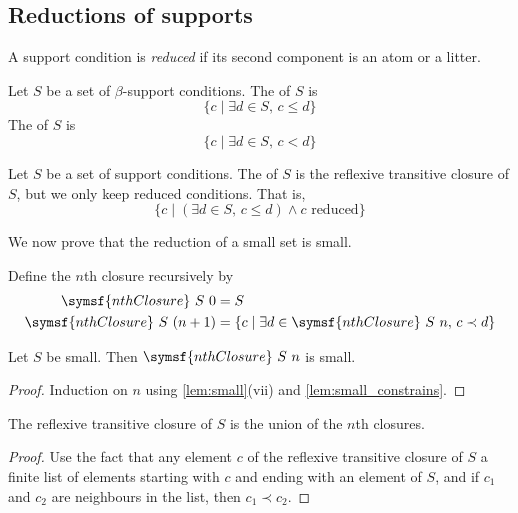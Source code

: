 \subsection{Reductions of supports}
\begin{definition}
    A support condition is \emph{reduced} if its second component is an atom or a litter.
\end{definition}
\begin{definition}
    Let \( S \) be a set of \( \beta \)-support conditions.
    The  of \( S \) is
    \[ \{c \mid \exists d \in S,\, c \leq d\} \]
    The  of \( S \) is
    \[ \{c \mid \exists d \in S,\, c < d\} \]
\end{definition}
\begin{definition}
    Let \( S \) be a set of support conditions.
    The  of \( S \) is the reflexive transitive closure of \( S \), but we only keep reduced conditions.
    That is,
    \[ \{c \mid (\exists d \in S,\, c \leq d) \wedge c \text{ reduced}\} \]
\end{definition}
We now prove that the reduction of a small set is small.
\begin{definition}
    Define the \( n \)th closure recursively by
    \begin{align*}
        \symsf{nthClosure}\ S\ 0 &= S \\
        \symsf{nthClosure}\ S\ (n + 1) &= \{ c \mid \exists d \in \symsf{nthClosure}\ S\ n,\, c \prec d \}
    \end{align*}
\end{definition}
\begin{lemma}
    \label{lem:nthClosure_small}
    Let \( S \) be small.
    Then \( \symsf{nthClosure}\ S\ n \) is small.
\end{lemma}
\begin{proof}
    Induction on \( n \) using \cref{lem:small}(vii) and \cref{lem:small_constrains}.
\end{proof}
\begin{lemma}
    \label{lem:reflTransClosure_eq_iUnion_nthClosure}
    The reflexive transitive closure of \( S \) is the union of the \( n \)th closures.
\end{lemma}
\begin{proof}
    Use the fact that any element \( c \) of the reflexive transitive closure of \( S \)  a finite list of elements starting with \( c \) and ending with an element of \( S \), and if \( c_1 \) and \( c_2 \) are neighbours in the list, then \( c_1 \prec c_2 \).
\end{proof}
